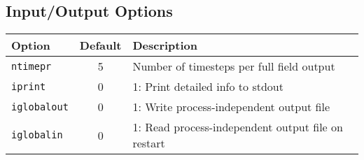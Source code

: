 \documentclass[letterpaper]{book}
\begin{document}
\subsection{Input/Output Options}

\begin{tabular}{lcp{2.7in}}
  \textbf{Option}&\textbf{Default}&\textbf{Description}\\
  \hline
  \texttt{ntimepr}   & 5 & Number of timesteps per full field output\\
  \texttt{iprint}    & 0 & 1: Print detailed info to stdout\\
  \texttt{iglobalout}& 0 & 1: Write process-independent output file\\
  \texttt{iglobalin} & 0 & 1: Read process-independent output file on restart
\end{tabular}





\appendix




\end{document}
